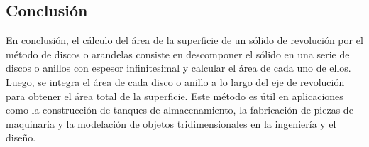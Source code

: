 \documentclass{article}
\begin{document}
\subsection{Conclusión}
En conclusión, el cálculo del área de la superficie de un sólido de revolución por el método de discos o arandelas consiste en descomponer el sólido en una serie de discos o anillos con espesor infinitesimal y calcular el área de cada uno de ellos. Luego, se integra el área de cada disco o anillo a lo largo del eje de revolución para obtener el área total de la superficie. Este método es útil en aplicaciones como la construcción de tanques de almacenamiento, la fabricación de piezas de maquinaria y la modelación de objetos tridimensionales en la ingeniería y el diseño.
\end{document}
